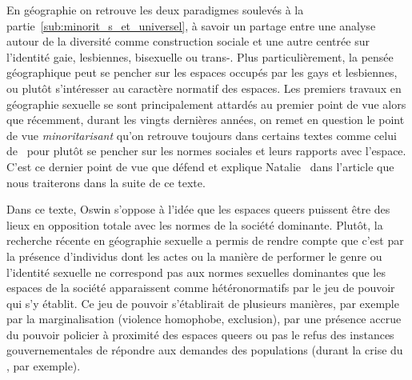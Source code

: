 
En géographie \qu{} on retrouve les deux paradigmes soulevés à la partie~\ref{sub:minorit_s_et_universel}, à savoir un partage entre une analyse autour de la diversité comme construction sociale et une autre centrée sur l'identité gaie, lesbiennes, bisexuelle ou trans-. 
Plus particulièrement, la pensée géographique peut se pencher sur les espaces occupés par les gays et lesbiennes, ou plutôt s'intéresser au caractère normatif des espaces. 
Les premiers travaux en géographie sexuelle se sont principalement attardés au premier point de vue alors que récemment, durant les vingts dernières années, on remet en question le point de vue \emph{minoritarisant} qu'on retrouve toujours dans certains textes comme celui de~\citet{Sinfield1996} pour plutôt se pencher sur les normes sociales et leurs rapports avec l'espace. 
C'est ce dernier point de vue que défend et explique Natalie~\citet{Oswin2008} dans l'article  que nous traiterons dans la suite de ce texte.

Dans ce texte, Oswin s'oppose à l'idée que les espaces queers puissent être des lieux en opposition totale avec les normes de la société dominante. 
Plutôt, la recherche récente en géographie sexuelle a permis de rendre compte que c'est par la présence d'individus dont les actes ou la manière de performer le genre ou l'identité sexuelle ne correspond pas aux normes sexuelles dominantes que les espaces de la société apparaissent comme hétéronormatifs par le jeu de pouvoir qui s'y établit. 
Ce jeu de pouvoir s'établirait de plusieurs manières, par exemple par la marginalisation (violence homophobe, exclusion), par une présence accrue du pouvoir policier à proximité des espaces queers ou pas le refus des instances gouvernementales de répondre aux demandes des populations \lgbt{} (durant la crise du \sida, par exemple).

